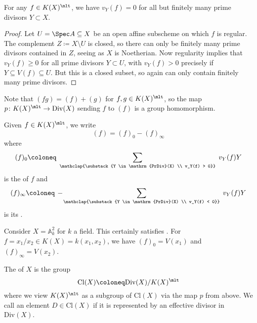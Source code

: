 \documentclass[wip, algebra]{bsteffan-lecturenotes}
\newcommand{\A}{\mathbb{A}}
\newcommand{\Div}{\mathrm{Div}}
\newcommand{\PrDiv}{\mathrm{PrDiv}}
\newcommand{\Cl}{\mathrm{Cl}}
\begin{document}
\begin{lemma}
	For any $f \in K(X)^\mlt$, we have $v_Y(f) = 0$ for all but finitely many prime divisors $Y \subset X$.
\end{lemma}
\begin{proof}
	Let $U = \Spec A \subseteq X$ be an open affine subscheme on which $f$ is regular. 
	The complement $Z \coloneq X \setminus U$ is closed, so there can only be finitely many prime divisors contained in $Z$, seeing as $X$ is Noetherian.
	Now regularity implies that $v_Y(f) \geq 0$ for all prime divisors $Y \subset U$, with $v_Y(f) > 0$ precisely if $Y \subseteq V(f) \subseteq U$. 
	But this is a closed subset, so again can only contain finitely many prime divisors.
\end{proof}
Note that $(fg) = (f) + (g)$ for $f, g \in K(X)^\mlt$, so the map $p\colon K(X)^\mlt \to \Div(X)$ sending $f$ to $(f)$ is a group homomorphism.
\begin{definition}
	Given $f \in K(X)^\mlt$, we write
	\begin{equation*}
		(f) = (f)_0 - (f)_\infty
	\end{equation*}
	where 
	\begin{equation*}
		(f)_0 \coloneq \;\sum_{\mathclap{\substack{Y \in \PrDiv(X) \\ v_Y(f) > 0}}}\; v_Y(f) Y
	\end{equation*}
	is the  of $f$ and 
	\begin{equation*}
		(f)_\infty \coloneq \,-\!\sum_{\mathclap{\substack{Y \in \PrDiv(X) \\ v_Y(f) < 0}}}\; v_Y(f) Y
	\end{equation*}
	is its .
\end{definition}
\begin{example}
	Consider $X = \A^2_k$ for $k$ a field.
	This certainly satisfies .
	For $f = x_1 / x_2 \in K(X) = k(x_1, x_2)$, we have $(f)_0 = V(x_1)$ and $(f)_\infty = V(x_2)$.
\end{example}
\begin{definition}
	The  of $X$ is the group
	\begin{equation*}
		\Cl(X) \coloneq \Div(X) / K(X)^\mlt
	\end{equation*}
	where we view $K(X)^\mlt$ as a subgroup of $\Cl(X)$ via the map $p$ from above.
	We call an element $D \in \Cl(X)$  if it is represented by an effective divisor in $\Div(X)$.
\end{definition}
\end{document}
